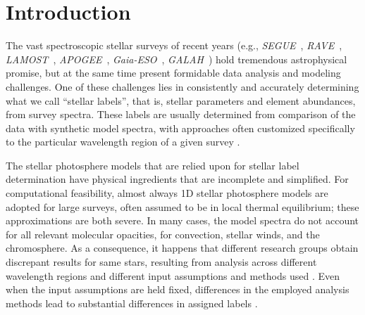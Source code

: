 \documentclass[12pt, preprint]{aastex}
\newcommand{\apogee}{\textsl{APOGEE}}
\newcommand{\galah}{\textsl{GALAH}}
\newcommand{\segue}{\textsl{SEGUE}}
\newcommand{\gaiaeso}{\textsl{Gaia-ESO}}
\newcommand{\rave}{\textsl{RAVE}}
\newcommand{\lamost}{\textsl{LAMOST}}
\begin{document}

\section{Introduction}\label{sec:Intro}


The vast spectroscopic stellar surveys of recent years (e.g., \segue\ \citep{Beers2006}, \rave\ \citep{Steinmetz2006}, \lamost\ \citep{Newberg2012}, \apogee\ \citep{Majewski2012}, \gaiaeso\ \citep{Gilmore2012}, \galah\ \citep{Freeman2012}) hold tremendous astrophysical promise, but at the same time present formidable data analysis and modeling challenges. 
One of these challenges lies in consistently and accurately determining what we call ``stellar labels'', that is, stellar parameters and element abundances, from survey spectra. 
These labels are usually determined from comparison of the data with synthetic model spectra, with approaches often 
customized specifically to the particular wavelength region of a given survey \citep[e.g.,][]{ Lee2006, Boeche2011, Liu2014, Meszaros2013, SM2014, BJ2013}. 

The stellar photosphere models that are relied upon for stellar label determination have physical ingredients that are incomplete and simplified. 
For computational feasibility, almost always 1D stellar photosphere models are adopted for large surveys, often assumed to be in local thermal equilibrium; these approximations are both severe. 
In many cases, the model spectra do not account for all relevant molecular opacities, for convection, stellar winds, and the chromosphere. 
As a consequence, it happens that different research groups obtain discrepant results for same stars, resulting from analysis across different wavelength regions and different input assumptions and methods used \citep[e.g.,][]{Hinkel2014, Jofre2014, AP1999}. Even when the input assumptions are held fixed, differences in the employed analysis methods lead to substantial differences in assigned labels \citep[e.g.][]{SM2014}.
\end{document}
